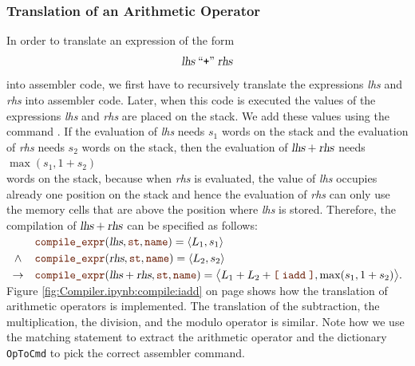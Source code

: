 \subsubsection{Translation of an Arithmetic Operator}
In order to translate an expression of the form
\[ \textsl{lhs} \;\mbox{``\texttt{+}''}\; \textsl{rhs} \]
into assembler code, we first have to recursively translate the expressions \textsl{lhs} and
\textsl{rhs} into assembler code.  Later, when this code is executed the values of the expressions
\textsl{lhs} and \textsl{rhs} are placed on the stack.  We add these values using the command .
If the evaluation of \textsl{lhs} needs $s_1$ words on the stack and the evaluation of \textsl{rhs} needs $s_2$
words on the stack, then the evaluation of $\textsl{lhs} + \textsl{rhs}$ needs 
\\[0.2cm]
\hspace*{1.3cm}
$\max(s_1, 1 + s_2)$
\\[0.2cm]
words on the stack, because when \textsl{rhs} is evaluated, the value of \textsl{lhs} occupies already one position
on the stack and hence the evaluation of \textsl{rhs} can only use the memory cells that are above the position
where \textsl{lhs} is stored. Therefore, the compilation of $\textsl{lhs} + \textsl{rhs}$ can be specified as
follows:
\\[0.2cm]
\hspace*{1.3cm}
$
\begin{array}[t]{cll}
        & \mytt{compile\_expr}(\textsl{lhs}, \mytt{st}, \mytt{name}) = \pair(L_1, s_1)  \\[0.1cm]
\wedge  & \mytt{compile\_expr}(\textsl{rhs}, \mytt{st}, \mytt{name}) = \pair(L_2, s_2)  \\[0.1cm]
\rightarrow & \mytt{compile\_expr}(\textsl{lhs} + \textsl{rhs}, \mytt{st}, \mytt{name}) = 
            \bigl\langle L_1 + L_2 + \mytt{[}\; \mytt{iadd} \;\mytt{]}, \max(s_1, 1+s_2) \bigr\rangle.
\end{array}$
\\[0.2cm]
Figure \ref{fig:Compiler.ipynb:compile:iadd} on page \pageref{fig:Compiler.ipynb:compile:iadd} shows how the
translation of arithmetic operators is implemented.  The translation of the subtraction, the multiplication, the
division, and the modulo operator is similar.  Note how we use the matching statement to extract the arithmetic
operator and the dictionary \texttt{OpToCmd} to pick the correct assembler command.

